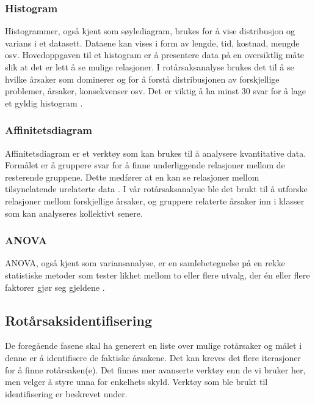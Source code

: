 \subsubsection{Histogram}
Histogrammer, også kjent som søylediagram, brukes for å vise distribusjon og varians i et datasett. Dataene kan vises i form av lengde, tid, kostnad, mengde osv. Hovedoppgaven til et histogram er å presentere data på en oversiktlig måte slik at det er lett å se mulige relasjoner. I rotårsaksanalyse brukes det til å se hvilke årsaker som dominerer og for å forstå distribusjonen av forskjellige problemer, årsaker, konsekvenser osv. \cite{RCA} Det er viktig å ha minst 30 svar for å lage et gyldig histogram \cite{RCA}.

\subsubsection{Affinitetsdiagram}
Affinitetsdiagram er et verktøy som kan brukes til å analysere kvantitative data. Formålet er å gruppere svar for å finne underliggende relasjoner mellom de resterende gruppene. Dette medfører at en kan se relasjoner mellom tilsynelatende urelaterte data \cite{RCA}. I vår rotårsaksanalyse ble det brukt til å utforske relasjoner mellom forskjellige årsaker, og gruppere relaterte årsaker inn i klasser som kan analyseres kollektivt senere. 

\subsubsection{ANOVA}
ANOVA, også kjent som variansanalyse, er en samlebetegnelse på en rekke statistiske metoder som tester likhet mellom to eller flere utvalg, der én eller flere faktorer gjør seg gjeldene \cite{ANOVA}. 

\subsection{Rotårsaksidentifisering}
De foregående fasene skal ha generert en liste over mulige rotårsaker og målet i denne er å identifisere de faktiske årsakene. Det kan kreves det flere iterasjoner for å finne rotårsaken(e). Det finnes mer avanserte verktøy enn de vi bruker her, men velger å styre unna for enkelhets skyld. Verktøy som ble brukt til identifisering er beskrevet under. 

